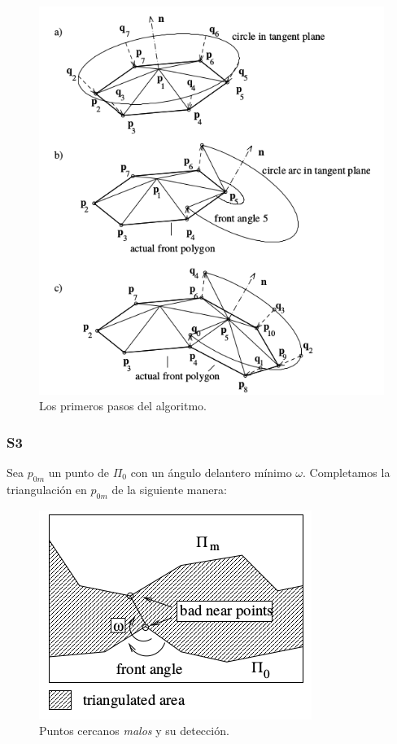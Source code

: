\begin{figure}[h]
\centering
\includegraphics[scale=0.6]{images/hartmann3.png}
\caption{Los primeros pasos del algoritmo.}
\end{figure}

\subsubsection{S3}

Sea $p_{0m}$ un punto de $\Pi_0$  con un ángulo delantero mínimo $\omega$. Completamos la triangulación en $p_{0m}$ de la siguiente manera:

\begin{figure}[h]
\centering
\includegraphics[scale=0.5]{images/hartmann4.png}
\caption{Puntos cercanos \textit{malos} y su detección.}
\end{figure}

